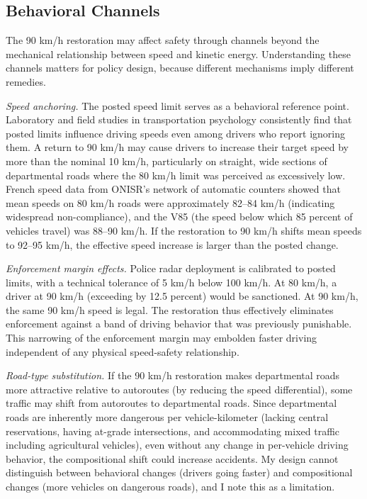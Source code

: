 \documentclass[12pt]{article}
\begin{document}
\subsection{Behavioral Channels}

The 90 km/h restoration may affect safety through channels beyond the mechanical relationship between speed and kinetic energy. Understanding these channels matters for policy design, because different mechanisms imply different remedies.

\textit{Speed anchoring.} The posted speed limit serves as a behavioral reference point. Laboratory and field studies in transportation psychology consistently find that posted limits influence driving speeds even among drivers who report ignoring them. A return to 90 km/h may cause drivers to increase their target speed by more than the nominal 10 km/h, particularly on straight, wide sections of departmental roads where the 80 km/h limit was perceived as excessively low. French speed data from ONISR's network of automatic counters showed that mean speeds on 80 km/h roads were approximately 82--84 km/h (indicating widespread non-compliance), and the V85 (the speed below which 85 percent of vehicles travel) was 88--90 km/h. If the restoration to 90 km/h shifts mean speeds to 92--95 km/h, the effective speed increase is larger than the posted change.

\textit{Enforcement margin effects.} Police radar deployment is calibrated to posted limits, with a technical tolerance of 5 km/h below 100 km/h. At 80 km/h, a driver at 90 km/h (exceeding by 12.5 percent) would be sanctioned. At 90 km/h, the same 90 km/h speed is legal. The restoration thus effectively eliminates enforcement against a band of driving behavior that was previously punishable. This narrowing of the enforcement margin may embolden faster driving independent of any physical speed-safety relationship.

\textit{Road-type substitution.} If the 90 km/h restoration makes departmental roads more attractive relative to autoroutes (by reducing the speed differential), some traffic may shift from autoroutes to departmental roads. Since departmental roads are inherently more dangerous per vehicle-kilometer (lacking central reservations, having at-grade intersections, and accommodating mixed traffic including agricultural vehicles), even without any change in per-vehicle driving behavior, the compositional shift could increase accidents. My design cannot distinguish between behavioral changes (drivers going faster) and compositional changes (more vehicles on dangerous roads), and I note this as a limitation.
\end{document}
